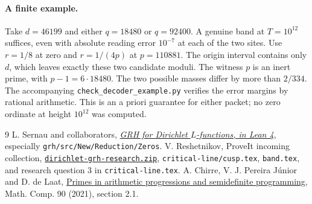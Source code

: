 \documentclass[11pt]{article}
\begin{document}
\paragraph{A finite example.}
Take $d=46199$ and either $q=18480$ or $q=92400$. A genuine band at
$T=10^{12}$ suffices, even with absolute reading error $10^{-7}$ at each
of the two sites. Use $r=1/8$ at zero and $r=1/(4p)$ at $p=110881$.
The origin interval contains only $d$, which leaves exactly these two
candidate moduli. The witness $p$ is an inert prime, with $p-1=6\cdot18480$.
The two possible masses differ by more than $2/334$. The accompanying
\texttt{check\_decoder\_example.py} verifies the error margins by rational
arithmetic. This is an a priori guarantee for either packet; no zero
ordinate at height $10^{12}$ was computed.
\begin{thebibliography}{9}
 L. Sernau and collaborators,
\href{https://github.com/lsernau/grh-lean/tree/72fead102f663d5c7a407964a13dc0cf9d977207}{\emph{GRH for Dirichlet $L$-functions, in Lean 4}},
especially \texttt{grh/src/New/Reduction/Zeros}.
 V. Reshetnikov, ProveIt incoming collection,
\href{https://github.com/VladimirReshetnikov/ProveIt/blob/d31039a48d963692e5a5176f47b6603fc9e9d9cf/docs/incoming/dirichlet-grh-research.zip}{\texttt{dirichlet-grh-research.zip}},
\texttt{critical-line/cusp.tex}, \texttt{band.tex}, and research question 3
in \texttt{critical-line.tex}.
 A. Chirre, V. J. Pereira J\'unior and D. de Laat,
\href{https://doi.org/10.1090/mcom/3638}{Primes in arithmetic progressions
and semidefinite programming}, Math. Comp. 90 (2021), section 2.1.
\end{thebibliography}
\end{document}
